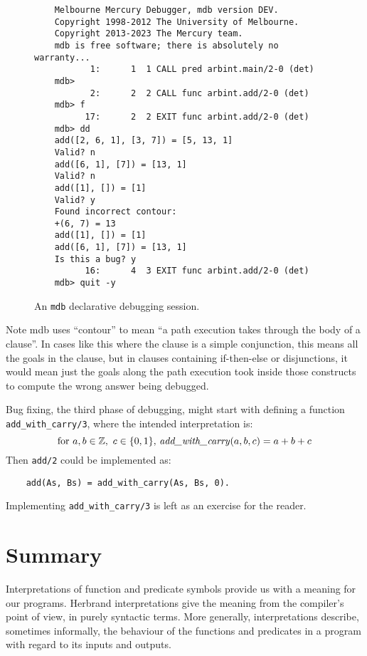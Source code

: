 \begin{figure}[hb]
\begin{verbatim}
    Melbourne Mercury Debugger, mdb version DEV.
    Copyright 1998-2012 The University of Melbourne.
    Copyright 2013-2023 The Mercury team.
    mdb is free software; there is absolutely no warranty...
           1:      1  1 CALL pred arbint.main/2-0 (det)
    mdb>
           2:      2  2 CALL func arbint.add/2-0 (det)
    mdb> f
          17:      2  2 EXIT func arbint.add/2-0 (det)
    mdb> dd
    add([2, 6, 1], [3, 7]) = [5, 13, 1]
    Valid? n
    add([6, 1], [7]) = [13, 1]
    Valid? n
    add([1], []) = [1]
    Valid? y
    Found incorrect contour:
    +(6, 7) = 13
    add([1], []) = [1]
    add([6, 1], [7]) = [13, 1]
    Is this a bug? y
          16:      4  3 EXIT func arbint.add/2-0 (det)
    mdb> quit -y
\end{verbatim}
\caption{
An \texttt{mdb} declarative debugging session.
\label{fig:dd-session}}
\end{figure}

Note mdb uses ``contour'' to mean
``a path execution takes through the body of a clause''.
In cases like this where the clause is a simple conjunction,
this means all the goals in the clause,
but in clauses containing if-then-else or disjunctions,
it would mean just the goals along the path execution took
inside those constructs to compute the wrong answer being debugged.

\label{end:decl-debug}

Bug fixing,
the third phase of debugging,
might start with defining a function \texttt{add\_with\_carry/3},
where the intended interpretation is:
\[
    \text{for }a, b \in \mathbb{Z},\ c \in \{0, 1\},
        \,\text{\textit{add\_with\_carry}}(a, b, c) = a + b + c
\]
Then \texttt{add/2} could be implemented as:
\begin{verbatim}
    add(As, Bs) = add_with_carry(As, Bs, 0).
\end{verbatim}
Implementing \texttt{add\_with\_carry/3}
is left as an exercise for the reader.

\section{Summary}

Interpretations of function and predicate symbols
provide us with a meaning for our programs.
Herbrand interpretations give the meaning
from the compiler's point of view,
in purely syntactic terms.
More generally, interpretations describe,
sometimes informally,
the behaviour of the functions and predicates in a program
with regard to its inputs and outputs.

